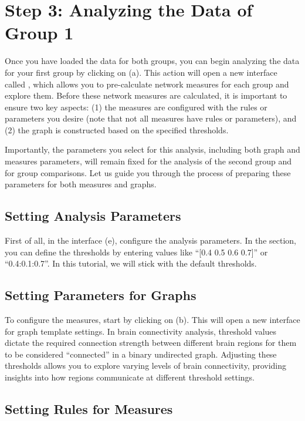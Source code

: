 \documentclass[justified]{tufte-handout}
\begin{document}
\section{Step 3: Analyzing the Data of Group 1}

Once you have loaded the data for both groups, you can begin analyzing the data for your first group by clicking on  (a). 
This action will open a new interface called , which allows you to pre-calculate network measures for each group and explore them. 
Before these network measures are calculated, it is important to ensure two key aspects: (1) the measures are configured with the rules or parameters you desire (note that not all measures have rules or parameters), and (2) the graph is constructed based on the specified thresholds.

Importantly, the parameters you select for this analysis, including both graph and measures parameters, will remain fixed for the analysis of the second group and for group comparisons. Let us guide you through the process of preparing these parameters for both measures and graphs.

\subsection{Setting Analysis Parameters}

First of all, in the  interface (e), configure the analysis parameters.
In the  section, you can define the thresholds by entering values like ``[0.4 0.5 0.6 0.7]'' or ``0.4:0.1:0.7''. 
In this tutorial, we will stick with the default thresholds. 

\subsection{Setting Parameters for Graphs}

To configure the measures, start by clicking on  (b). This will open a new interface for graph template settings. 
In brain connectivity analysis, threshold values dictate the required connection strength between different brain regions for them to be considered “connected” in a binary undirected graph. 
Adjusting these thresholds allows you to explore varying levels of brain connectivity, providing insights into how regions communicate at different threshold settings.

\subsection{Setting Rules for Measures}
\end{document}
